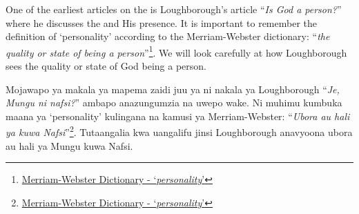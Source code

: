 



One of the earliest articles on the  is Loughborough’s article “\textit{Is God a person?}” where he discusses the  and His presence. It is important to remember the definition of ‘personality’ according to the Merriam-Webster dictionary: “\textit{the quality or state of being a person}”\footnote{\href{https://www.merriam-webster.com/dictionary/personality}{Merriam-Webster Dictionary - ‘\textit{personality}’}}. We will look carefully at how Loughborough sees the quality or state of God being a person.


Mojawapo ya makala ya mapema zaidi juu ya  ni nakala ya Loughborough “\textit{Je, Mungu ni nafsi?}” ambapo anazungumzia  na uwepo wake. Ni muhimu kumbuka maana ya ‘personality’ kulingana na kamusi ya Merriam-Webster: “\textit{Ubora au hali ya kuwa Nafsi}”\footnote{\href{https://www.merriam-webster.com/dictionary/personality}{Merriam-Webster Dictionary - ‘\textit{personality}’}}. Tutaangalia kwa uangalifu jinsi Loughborough anavyoona ubora au hali ya Mungu kuwa Nafsi.


